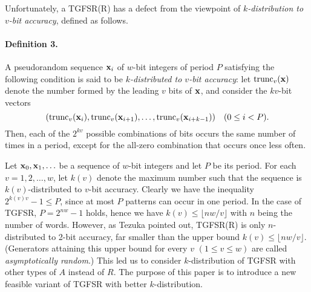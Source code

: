 Unfortunately, a TGFSR(R) has a defect from the viewpoint
of 
{\em $k$-distribution to $v$-bit accuracy}\cite{tootill},
defined as follows.
\paragraph{Definition 3.}
A pseudorandom sequence ${{\bf x}_i}$ of $w$-bit integers
of period $P$
satisfying the following condition
is said to be 
{\em $k$-distributed to $v$-bit accuracy}:
let $\mbox{trunc}_v({\bf x})$ denote the number formed by the leading
$v$ bits of ${\bf x}$, and consider
the $kv$-bit vectors
$$ 
   (\mbox{trunc}_v({\bf x}_i), \mbox{trunc}_v({\bf x}_{i+1}), \ldots, 
   \mbox{trunc}_v({\bf x}_{i+k-1})) \ \ \ (0\leq i < P).
$$
Then, each of the $2^{kv}$ possible combinations of bits
occurs the same number of times in a period,
except for the all-zero combination
that occurs once less often.
\vskip 3mm

Let ${\bf x}_0,{\bf x}_1,\ldots$ be a sequence
of $w$-bit integers
and let
$P$ be its period.
For each $v=1,2,\ldots,w$, let $k(v)$ denote
the maximum number such that the sequence
is $k(v)$-distributed to $v$-bit accuracy.
Clearly we have the inequality $2^{k(v)v}-1 \leq P$,
since at most $P$ patterns can occur in one period.
In the case of TGFSR, $P=2^{nw}-1$ holds,
hence we have $k(v) \leq \lfloor nw/v\rfloor $ 
with $n$ being the number of words.
However, as Tezuka\cite{tezuka}
pointed out, TGFSR(R) is only 
$n$-distributed to 2-bit accuracy,
far smaller than the upper bound $k(v) \leq \lfloor nw/v\rfloor$.
(Generators attaining this upper bound for every
$v$ $(1\leq v \leq w)$ are called
{\em asymptotically random}\cite{tootill}.)
This led us to consider
$k$-distribution of TGFSR with other types of
$A$ instead of $R$.
The purpose of this paper is to introduce a new feasible
variant of TGFSR with better $k$-distribution.

